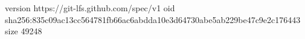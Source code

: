 version https://git-lfs.github.com/spec/v1
oid sha256:835c09ac13cc564781fb66ac6abdda10e3d64730abe5ab229be47c9e2c176443
size 49248
